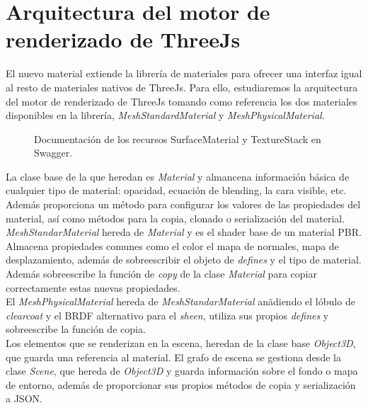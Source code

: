\section{Arquitectura del motor de renderizado de ThreeJs}
El nuevo material extiende la librer\'ia de materiales para ofrecer una interfaz igual al resto de materiales nativos
de ThreeJs. Para ello, estudiaremos la arquitectura del motor de renderizado de ThreeJs tomando como referencia los dos
materiales disponibles en la librer\'ia, \textit{MeshStandardMaterial} y \textit{MeshPhysicalMaterial}.

\begin{figure}[H]
  \centering
  \caption{Documentaci\'on de los recursos SurfaceMaterial y TextureStack en Swagger.}
  \vspace{0.5cm}
\end{figure}

La clase base de la que heredan es \textit{Material} y almancena informaci\'on b\'asica de
cualquier tipo de material: opacidad, ecuaci\'on de blending, la cara visible, etc. Adem\'as proporciona un m\'etodo
para configurar los valores de las propiedades del material, as\'i como m\'etodos para la copia, clonado o serializaci\'on
del material.\\

\textit{MeshStandarMaterial} hereda de \textit{Material} y es el shader base de un material PBR. Almacena propiedades comunes
como el color el mapa de normales, mapa de desplazamiento, adem\'as de sobreescribir el objeto de \textit{defines} y el tipo
de material. Adem\'as sobreescribe la funci\'on de \textit{copy} de la clase \textit{Material} para copiar correctamente
estas nuevas propiedades.\\

El \textit{MeshPhysicalMaterial} hereda de \textit{MeshStandarMaterial} an\~adiendo el l\'obulo de \textit{clearcoat} y
el BRDF alternativo para el \textit{sheen}, utiliza sus propios \textit{defines} y sobreescribe la funci\'on de copia.\\

Los elementos que se renderizan en la escena, heredan de la clase base \textit{Object3D}, que guarda una referencia
al material. El grafo de escena se gestiona desde la clase \textit{Scene}, que hereda de \textit{Object3D} y guarda
informaci\'on sobre el fondo o mapa de entorno, adem\'as de proporcionar sus propios m\'etodos de copia y serializaci\'on
a JSON.

